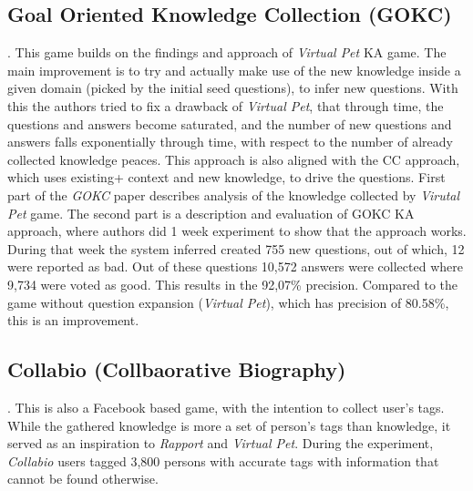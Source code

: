 \subsection{Goal Oriented Knowledge Collection (GOKC)}. This game builds on the
findings and approach of \emph{Virtual Pet} KA game. The main improvement
is to try and actually make use of the new knowledge inside a given domain
(picked by the initial seed questions), to infer new questions. With this
the authors tried to fix a drawback of \emph{Virtual Pet}, that through
time, the questions and answers become saturated, and the number of new
questions and answers falls exponentially through time, with respect
to the number of already collected knowledge peaces.
This approach is also aligned with the CC approach, which uses existing+
context and new knowledge, to drive the questions. First part of the \emph{GOKC}
paper describes analysis of the knowledge collected by \emph{Virutal Pet} game. 
The second part is a description and evaluation of  GOKC KA approach, where 
authors did 1 week experiment to show that the approach works. During that 
week the system inferred created 755 new questions, out of which, 12 were
reported as bad. Out of these questions 10,572 answers were collected where
9,734 were voted as good. This results in the 92,07\% precision. Compared
to the game without question expansion (\emph{Virtual Pet}), which has
precision of 80.58\%, this is an improvement.

\subsection{Collabio (Collbaorative Biography)}. This is also a Facebook based game, with the intention to
collect user's tags. While the gathered knowledge is more a set of person's 
tags than knowledge, it served as an inspiration to \emph{Rapport} and 
\emph{Virtual Pet}. During the experiment, \emph{Collabio} users tagged
3,800 persons with accurate tags with information that cannot be found 
otherwise\parencite{Bernstein2009, Bernstein2010}.

